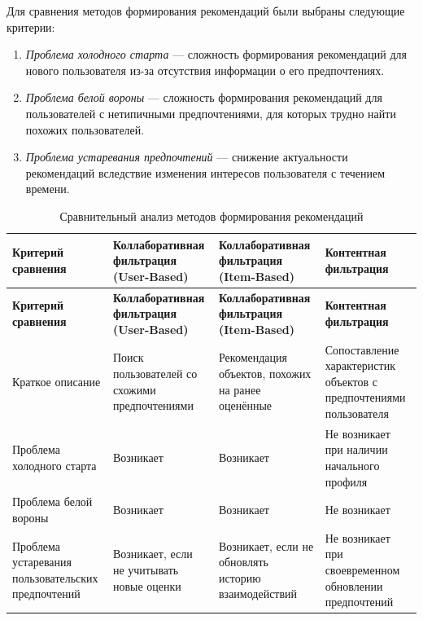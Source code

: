 Для сравнения методов формирования рекомендаций были выбраны следующие критерии:

\begin{enumerate}
	\item \textit{Проблема холодного старта} --- сложность формирования рекомендаций для нового пользователя из-за отсутствия информации о его предпочтениях.
	
	\item \textit{Проблема белой вороны} --- сложность формирования рекомендаций для пользователей с нетипичными предпочтениями, для которых трудно найти похожих пользователей.
	
	\item \textit{Проблема устаревания предпочтений} --- снижение актуальности рекомендаций вследствие изменения интересов пользователя с течением времени.
\end{enumerate}

\begin{longtable}{|p{}|p{}|p{}|p{}|}
	\caption{Сравнительный анализ методов формирования рекомендаций}
	\label{tab:methods}\\ \hline
	
	\textbf{Критерий сравнения} &
	\textbf{Коллаборативная фильтрация (User-Based)} &
	\textbf{Коллаборативная фильтрация (Item-Based)} &
	\textbf{Контентная фильтрация} \\ \hline
	\endfirsthead
	
	\hline
	\textbf{Критерий сравнения} &
	\textbf{Коллаборативная фильтрация (User-Based)} &
	\textbf{Коллаборативная фильтрация (Item-Based)} &
	\textbf{Контентная фильтрация} \\ \hline
	\endhead
	
	Краткое описание &
	Поиск пользователей со схожими предпочтениями &
	Рекомендация объектов, похожих на ранее оценённые &
	Сопоставление характеристик объектов с предпочтениями пользователя \\ \hline
	
	Проблема холодного старта &
	Возникает &
	Возникает &
	Не возникает при наличии начального профиля \\ \hline
	
	Проблема белой вороны &
	Возникает &
	Возникает &
	Не возникает \\ \hline
	
	Проблема устаревания пользовательских предпочтений &
	Возникает, если не учитывать новые оценки &
	Возникает, если не обновлять историю взаимодействий &
	Не возникает при своевременном обновлении предпочтений \\ \hline
	
\end{longtable}